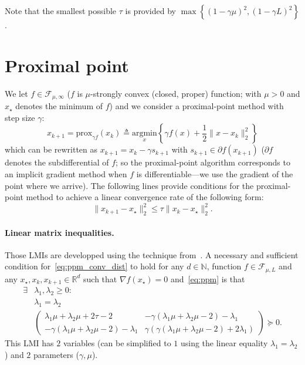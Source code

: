 \documentclass[nonacm]{acmart}
\renewcommand{\leq}{\leqslant}
\renewcommand{\geq}{\geqslant}
\renewcommand{\succeq}{\succcurlyeq}
\newcommand{\argmin}{\mathrm{argmin}}
\begin{document}
Note that the smallest possible $\tau$ is provided by $\max\left\{(1-\gamma\mu)^2,(1-\gamma L)^2\right\}$.


\section{Proximal point}
We let $f\in\mathcal{F}_{\mu,\infty}$ ($f$ is $\mu$-strongly convex (closed, proper) function; with $\mu>0$ and $x_\star$ denotes the minimum of $f$) and we consider a proximal-point method with step size $\gamma$:
\begin{equation}\label{eq:ppm}
x_{k+1}=\mathrm{prox}_{\gamma f}(x_k)\triangleq\underset{x}{\argmin} \left\{ \gamma f(x)+\frac{1}{2}\|x-x_k\|^2_2\right\}
\end{equation}
which can be rewritten as $x_{k+1}=x_k-\gamma s_{k+1}$ with $s_{k+1}\in\partial f(x_{k+1})$ ($\partial f$ denotes the subdifferential of $f$; so the proximal-point algorithm corresponds to an implicit gradient method when $f$ is differentiable---we use the gradient of the point where we arrive).
The following lines provide conditions for the proximal-point method to achieve a linear convergence rate of the following form:
\begin{equation}\label{eq:ppm_conv_dist}
\|x_{k+1}-x_\star\|^2_2 \leq \tau \|x_{k}-x_\star\|^2_2.
\end{equation}

\paragraph{Linear matrix inequalities.} Those LMIs are developped using the technique from~\cite{taylor2017exact}. A necessary and sufficient condition for~\eqref{eq:ppm_conv_dist} to hold for any $d\in\mathbb{N}$, function $f\in\mathcal{F}_{\mu,L}$ and any $x_\star,x_k,x_{k+1}\in\mathbb{R}^d$ such that $\nabla f(x_\star)=0$ and~\eqref{eq:ppm} is that
\begin{equation*}
\begin{aligned}
\exists &\lambda_1,\lambda_2\geq 0:\\
&\lambda_1=\lambda_2\\
&\begin{pmatrix}
\lambda_1 \mu +\lambda_2 \mu +2 \tau -2 & -\gamma  (\lambda_1 \mu +\lambda_2 \mu -2)-\lambda_1 \\
 -\gamma  (\lambda_1 \mu +\lambda_2 \mu -2)-\lambda_1 & \gamma  (\gamma  (\lambda_1 \mu +\lambda_2 \mu -2)+2 \lambda_1)
\end{pmatrix}\succeq 0.
\end{aligned}
\end{equation*}
This LMI has $2$ variables (can be simplified to $1$ using the linear equality $\lambda_1=\lambda_2$) and $2$ parameters ($\gamma,\mu$).
\end{document}
